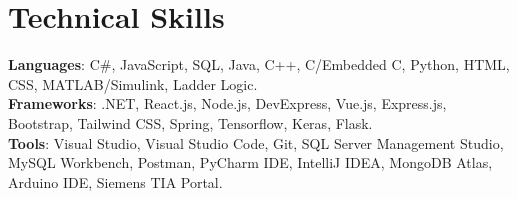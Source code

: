\documentclass[letterpaper,11pt]{article}
\begin{document}
\section{Technical Skills}
 \begin{itemize}[leftmargin=0.15in, label={}]
    \small{\item{
     \textbf{Languages}{: \mbox{C{\#}}, JavaScript, SQL, Java, C++, C/Embedded C, Python, HTML, CSS, MATLAB/Simulink, Ladder Logic.} \\
     \textbf{Frameworks}{: .NET, React.js, Node.js, DevExpress, Vue.js, Express.js, Bootstrap, Tailwind CSS, Spring, Tensorflow, Keras, Flask.} \\
     \textbf{Tools}{: Visual Studio, Visual Studio Code, Git, SQL Server Management Studio, MySQL Workbench, Postman, PyCharm IDE, IntelliJ IDEA, MongoDB Atlas, Arduino IDE, Siemens TIA Portal.} }}
 \end{itemize}
 \vspace{-16pt}
\end{document}
